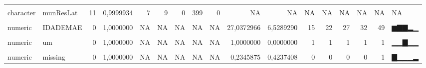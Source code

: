 \begin{table}[!h]
\begin{tabular}[t]{llrrrrrrrrrrrrrrl}
\cellcolor{gray!10}{character} & \cellcolor{gray!10}{munResUf} & \cellcolor{gray!10}{0} & \cellcolor{gray!10}{1,0000000} & \cellcolor{gray!10}{6} & \cellcolor{gray!10}{6} & \cellcolor{gray!10}{0} & \cellcolor{gray!10}{1} & \cellcolor{gray!10}{0} & \cellcolor{gray!10}{NA} & \cellcolor{gray!10}{NA} & \cellcolor{gray!10}{NA} & \cellcolor{gray!10}{NA} & \cellcolor{gray!10}{NA} & \cellcolor{gray!10}{NA} & \cellcolor{gray!10}{NA} & \cellcolor{gray!10}{NA}\\
character & munResLat & 11 & 0,9999934 & 7 & 9 & 0 & 399 & 0 & NA & NA & NA & NA & NA & NA & NA & NA\\
\cellcolor{gray!10}{character} & \cellcolor{gray!10}{munResLon} & \cellcolor{gray!10}{11} & \cellcolor{gray!10}{0,9999934} & \cellcolor{gray!10}{6} & \cellcolor{gray!10}{9} & \cellcolor{gray!10}{0} & \cellcolor{gray!10}{398} & \cellcolor{gray!10}{0} & \cellcolor{gray!10}{NA} & \cellcolor{gray!10}{NA} & \cellcolor{gray!10}{NA} & \cellcolor{gray!10}{NA} & \cellcolor{gray!10}{NA} & \cellcolor{gray!10}{NA} & \cellcolor{gray!10}{NA} & \cellcolor{gray!10}{NA}\\
\addlinespace
numeric & IDADEMAE & 0 & 1,0000000 & NA & NA & NA & NA & NA & 27,0372966 & 6,5289290 & 15 & 22 & 27 & 32 & 49 & ▆▇▇▂▁\\
\cellcolor{gray!10}{numeric} & \cellcolor{gray!10}{IDADEPAI} & \cellcolor{gray!10}{391382} & \cellcolor{gray!10}{0,7654125} & \cellcolor{gray!10}{NA} & \cellcolor{gray!10}{NA} & \cellcolor{gray!10}{NA} & \cellcolor{gray!10}{NA} & \cellcolor{gray!10}{NA} & \cellcolor{gray!10}{30,5851894} & \cellcolor{gray!10}{7,4809437} & \cellcolor{gray!10}{15} & \cellcolor{gray!10}{25} & \cellcolor{gray!10}{30} & \cellcolor{gray!10}{35} & \cellcolor{gray!10}{59} & \cellcolor{gray!10}{▃▇▆▁▁}\\
numeric & um & 0 & 1,0000000 & NA & NA & NA & NA & NA & 1,0000000 & 0,0000000 & 1 & 1 & 1 & 1 & 1 & ▁▁▇▁▁\\
\cellcolor{gray!10}{numeric} & \cellcolor{gray!10}{Ano} & \cellcolor{gray!10}{0} & \cellcolor{gray!10}{1,0000000} & \cellcolor{gray!10}{NA} & \cellcolor{gray!10}{NA} & \cellcolor{gray!10}{NA} & \cellcolor{gray!10}{NA} & \cellcolor{gray!10}{NA} & \cellcolor{gray!10}{2016,9013189} & \cellcolor{gray!10}{3,1258270} & \cellcolor{gray!10}{2012} & \cellcolor{gray!10}{2014} & \cellcolor{gray!10}{2017} & \cellcolor{gray!10}{2020} & \cellcolor{gray!10}{2022} & \cellcolor{gray!10}{▇▆▆▅▅}\\
numeric & missing & 0 & 1,0000000 & NA & NA & NA & NA & NA & 0,2345875 & 0,4237408 & 0 & 0 & 0 & 0 & 1 & ▇▁▁▁▂\\
\bottomrule
\end{tabular}
\end{table}